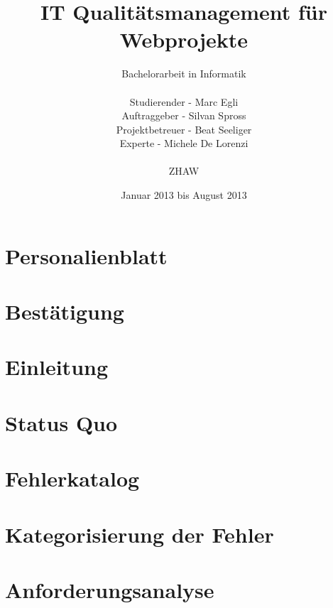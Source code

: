 \documentclass[
11pt, %
a4paper, %
BCOR10mm, %
DIV14, %
footsepline = false, %
headsepline, %
oneside, %
openright,
parskip=half, %
abstracton, %
listof=totocnumbered, %
bibliography=totocnumbered %
]{scrreprt}
\title{IT Qualitätsmanagement für Webprojekte}
\author{Bachelorarbeit in Informatik\\
    \\
    Studierender - Marc Egli\\
	Auftraggeber - Silvan Spross\\
    Projektbetreuer - Beat Seeliger\\
    Experte - Michele De Lorenzi\\
	\\
	ZHAW}
\date{Januar 2013 bis August 2013}
\begin{document}
  \ifpdf
  \else
  \fi
  
  \maketitle
  \begin{abstract}
    
  \end{abstract}

  
  \tableofcontents
  
  \chapter{Personalienblatt}
  
  
  \chapter{Bestätigung}
  
  
  \chapter{Einleitung}
  \label{cha:Einleitung}
  
  
  \chapter{Status Quo}
  \label{cha:status_quo}
  
  
  \chapter{Fehlerkatalog}
  \label{cha:fehlerkatalog}
  

  \chapter{Kategorisierung der Fehler}
  \label{cha:kategorisierung_der_fehler}
  
  
  \chapter{Anforderungsanalyse}
  \label{cha:anforderungsanalyse}
  
  
\end{document}
